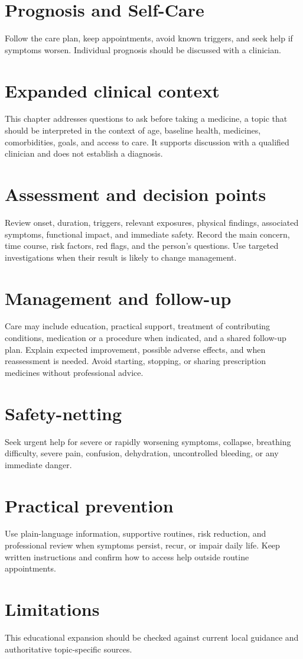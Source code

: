 \section*{Prognosis and Self-Care}
Follow the care plan, keep appointments, avoid known triggers, and seek help if symptoms worsen. Individual prognosis should be discussed with a clinician.

\section*{Expanded clinical context}
This chapter addresses questions to ask before taking a medicine, a topic that should be interpreted in the context of age, baseline health, medicines, comorbidities, goals, and access to care. It supports discussion with a qualified clinician and does not establish a diagnosis.

\section*{Assessment and decision points}
Review onset, duration, triggers, relevant exposures, physical findings, associated symptoms, functional impact, and immediate safety. Record the main concern, time course, risk factors, red flags, and the person’s questions. Use targeted investigations when their result is likely to change management.

\section*{Management and follow-up}
Care may include education, practical support, treatment of contributing conditions, medication or a procedure when indicated, and a shared follow-up plan. Explain expected improvement, possible adverse effects, and when reassessment is needed. Avoid starting, stopping, or sharing prescription medicines without professional advice.

\section*{Safety-netting}
Seek urgent help for severe or rapidly worsening symptoms, collapse, breathing difficulty, severe pain, confusion, dehydration, uncontrolled bleeding, or any immediate danger.

\section*{Practical prevention}
Use plain-language information, supportive routines, risk reduction, and professional review when symptoms persist, recur, or impair daily life. Keep written instructions and confirm how to access help outside routine appointments.

\section*{Limitations}
This educational expansion should be checked against current local guidance and authoritative topic-specific sources.
\clearpage
